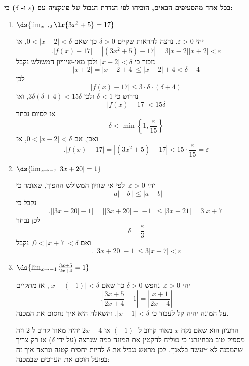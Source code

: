 \textbf{
בכל אחד מהסעיפים הבאים,
הוכיחו לפי הגדרת הגבול של פונקציה
עם
($\varepsilon$
ו-
$\delta$)
כי:}
\begin{enumerate}
\item
$\ds{\lim_{x\to 2} \lr{3x^2+5}=17}$
\ifsol
{}
\begin{solbox}
יהי
$\varepsilon>0$. נרצה להראות שקיים $\delta>0$ כך שאם $0<|x-2|<\delta$, אז
\[
.|f(x)-17|=\left|(3x^2+5)-17\right|=3|x-2||x+2|<\varepsilon
\]
נזכור כי
$|x-2|<\delta$
ולכן מאי-שיוויון המשולש נקבל
\[
|x+2|=|x-2+4|\leq |x-2|+4<\delta+4
\]
לכן
$$|f(x)-17|\le 3\cdot \delta\cdot (\delta+4)$$
נדרוש כי
$\delta<1$
ולכן
$3\delta(\delta+4)<15\delta$,
ואז
$$|f(x)-17|<15\delta$$
אז לסיום נבחר
\[
\delta<\min\left\{1,\frac{\varepsilon}{15}\right\}
\]
ואכן, אם $0<|x-2|<\delta$, אז
\[.|f(x)-17|=
\left|(3x^2+5)-17\right|<15\cdot\frac{\varepsilon}{15}=\varepsilon
\]
\end{solbox}
\fi

\item
$\ds{\lim_{x\to-7} |3x+20|=1}$
\ifsol
{}
\begin{solbox}
יהי $\varepsilon>0$.
לפי אי-שוויון המשולש ההפוך,
שאומר כי
$$||a|-|b||\le |a-b|$$
נקבל כי
\[
.\left||3x+20|-1\right|
=\left||3x+20|-|-1|\right|
\leq |3x+21|=3|x+7|
\]
לכן נבחר
\[
\delta=\frac{\varepsilon}{3}
\]
ואם $0<|x+7|<\delta$, נקבל
\[
.\left||3x+20|-1\right|\leq3|x+7|<\varepsilon
\]
\end{solbox}
\fi

\item
$\ds{\lim_{x\to-1}\frac{3x+5}{2x+4}=1}$
\ifsol
{}
\begin{solbox}
יהי $\varepsilon>0$.
נחפש
$\delta>0$
כך שאם
$|x-(-1)|<\delta$,
אז
מתקיים
\[
.\left|\frac{3x+5}{2x+4}-1\right|
=\left|\frac{x+1}{2x+4}\right|
\]
על המונה יהיה קל לעבוד כי
$|x+1|<\delta$,
והשאלה היא איך נחסום את המכנה.

הרעיון הוא שאם נקח
$x$
מאוד קרוב ל-
$(-1)$
אז
$2x+4$
יהיה מאוד קרוב ל-$2$
וזה מספיק טוב מבחינתנו כי נצליח להקטין את המונה כמה שנרצה (על ידי
$\delta$) אז רק צריך שהמכנה לא ״יעשה בלאגן״. לכן מראש נגביל את
$\delta$
להיות יחסית קטנה ונראה איך זה בפועל חוסם את הערכים שבמכנה:


\end{solbox}
\end{enumerate}
